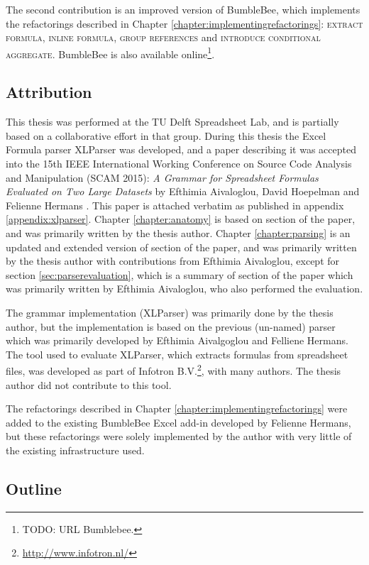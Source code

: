 \documentclass[12pt,a4paper,onecolumn,oneside,parskip]{memoir}
\newcommand{\rf}[1]{\textsc{\lowercase{#1}}}
\newcommand{\rom}[1]{\uppercase\expandafter{\romannumeral #1\relax}}
\begin{document}
The second contribution is an improved version of BumbleBee, which implements the refactorings described in Chapter \ref{chapter:implementingrefactorings}: \rf{Extract Formula}, \rf{Inline Formula}, \rf{Group References} and \rf{Introduce Conditional Aggregate}.
BumbleBee is also available online\footnote{TODO: URL Bumblebee.}.

\subsection{Attribution}

This thesis was performed at the TU Delft Spreadsheet Lab, and is partially based on a collaborative effort in that group.
During this thesis the Excel Formula parser XLParser was developed, and a paper describing it was accepted into the 15th IEEE International Working Conference on Source Code Analysis and Manipulation (SCAM 2015): \emph{A Grammar for Spreadsheet Formulas Evaluated on Two Large Datasets} by Efthimia Aivaloglou, David Hoepelman and Felienne Hermans \cite{xlparser}.
This paper is attached verbatim as published in appendix \ref{appendix:xlparser}.
Chapter \ref{chapter:anatomy} is based on section \rom{2} of the paper, and was primarily written by the thesis author.
Chapter \ref{chapter:parsing}  is an updated and extended version of section \rom{3} of the paper, and was primarily written by the thesis author with contributions from Efthimia Aivaloglou, except for section \ref{sec:parserevaluation}, which is a summary of section \rom{4} of the paper which was primarily written by Efthimia Aivaloglou, who also performed the evaluation.

The grammar implementation (XLParser) was primarily done by the thesis author, but the implementation is based on the previous (un-named) parser which was primarily developed by Efthimia Aivalgoglou and Felliene Hermans.
The tool used to evaluate XLParser, which extracts formulas from spreadsheet files, was developed as part of Infotron B.V.\footnote{\url{http://www.infotron.nl/}}, with many authors. The thesis author did not contribute to this tool.

The refactorings described in Chapter \ref{chapter:implementingrefactorings} were added to the existing BumbleBee Excel add-in developed by Felienne Hermans, but these refactorings were solely implemented by the author with very little of the existing infrastructure used.

\subsection{Outline}
\end{document}
